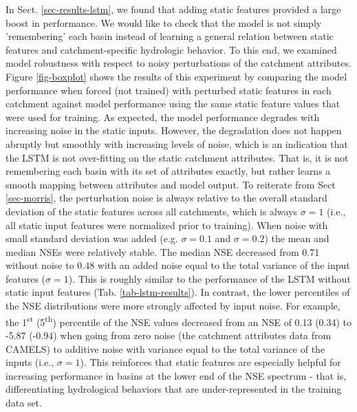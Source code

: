 In Sect. \ref{sec-results-lstm}, we found that adding static features provided a large boost in performance. We would like to check that the model is not simply 'remembering' each basin instead of learning a general relation between static features and catchment-specific hydrologic behavior. To this end, we examined model robustness with respect to noisy perturbations of the catchment attributes. Figure \ref{fig-boxplot} shows the results of this experiment by comparing the model performance when forced (not trained) with perturbed static features in each catchment against model performance using the same static feature values that were used for training. As expected, the model performance degrades with increasing noise in the static inputs. However, the degradation does not happen abruptly but smoothly with increasing levels of noise, which is an indication that the LSTM is not over-fitting on the static catchment attributes. That is, it is not remembering each basin with its set of attributes exactly, but rather learns a smooth mapping between attributes and model output. To reiterate from Sect \ref{sec-morris}, the perturbation noise is always relative to the overall standard deviation of the static features across all catchments, which is always $\sigma=1$ (i.e., all static input features were normalized prior to training). When noise with small standard deviation was added (e.g. $\sigma=0.1$ and $\sigma=0.2$) the mean and median \glspl{NSE} were relatively stable. The median \gls{NSE} decreased from 0.71 without noise to 0.48 with an added noise equal to the total variance of the input features ($\sigma=1$). 
This is roughly similar to the performance of the \gls{LSTM} without static input features (Tab. \ref{tab-lstm-results}). 
In contrast, the lower percentiles of the \gls{NSE} distributions were more strongly affected by input noise. For example, the 1\textsuperscript{st} (5\textsuperscript{th}) percentile of the \gls{NSE} values decreased from an \gls{NSE} of 0.13 (0.34) to -5.87 (-0.94) when going from zero noise (the catchment attributes data from \gls{CAMELS}) to additive noise with variance equal to the total variance of the inputs (i.e., $\sigma=1$). 
This reinforces that static features are especially helpful for increasing performance in basins at the lower end of the \gls{NSE} spectrum - that is, differentiating hydrological behaviors that are under-represented in the training data set.

